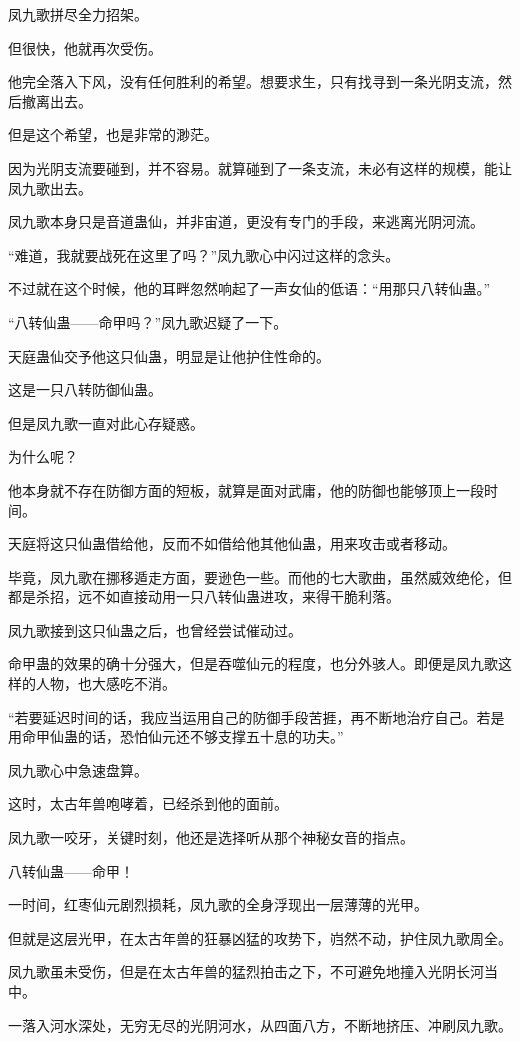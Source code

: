 \begin{this_body}
凤九歌拼尽全力招架。

但很快，他就再次受伤。

他完全落入下风，没有任何胜利的希望。想要求生，只有找寻到一条光阴支流，然后撤离出去。

但是这个希望，也是非常的渺茫。

因为光阴支流要碰到，并不容易。就算碰到了一条支流，未必有这样的规模，能让凤九歌出去。

凤九歌本身只是音道蛊仙，并非宙道，更没有专门的手段，来逃离光阴河流。

“难道，我就要战死在这里了吗？”凤九歌心中闪过这样的念头。

不过就在这个时候，他的耳畔忽然响起了一声女仙的低语：“用那只八转仙蛊。”

“八转仙蛊——命甲吗？”凤九歌迟疑了一下。

天庭蛊仙交予他这只仙蛊，明显是让他护住性命的。

这是一只八转防御仙蛊。

但是凤九歌一直对此心存疑惑。

为什么呢？

他本身就不存在防御方面的短板，就算是面对武庸，他的防御也能够顶上一段时间。

天庭将这只仙蛊借给他，反而不如借给他其他仙蛊，用来攻击或者移动。

毕竟，凤九歌在挪移遁走方面，要逊色一些。而他的七大歌曲，虽然威效绝伦，但都是杀招，远不如直接动用一只八转仙蛊进攻，来得干脆利落。

凤九歌接到这只仙蛊之后，也曾经尝试催动过。

命甲蛊的效果的确十分强大，但是吞噬仙元的程度，也分外骇人。即便是凤九歌这样的人物，也大感吃不消。

“若要延迟时间的话，我应当运用自己的防御手段苦捱，再不断地治疗自己。若是用命甲仙蛊的话，恐怕仙元还不够支撑五十息的功夫。”

凤九歌心中急速盘算。

这时，太古年兽咆哮着，已经杀到他的面前。

凤九歌一咬牙，关键时刻，他还是选择听从那个神秘女音的指点。

八转仙蛊——命甲！

一时间，红枣仙元剧烈损耗，凤九歌的全身浮现出一层薄薄的光甲。

但就是这层光甲，在太古年兽的狂暴凶猛的攻势下，岿然不动，护住凤九歌周全。

凤九歌虽未受伤，但是在太古年兽的猛烈拍击之下，不可避免地撞入光阴长河当中。

一落入河水深处，无穷无尽的光阴河水，从四面八方，不断地挤压、冲刷凤九歌。


\end{this_body}
